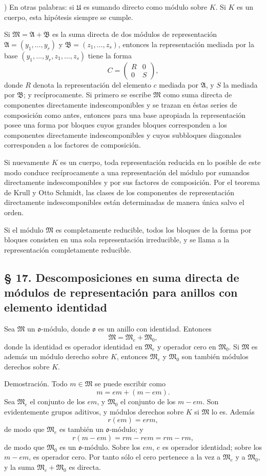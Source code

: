 \documentclass[11pt]{article}
\providecommand{\mA}{\mathfrak{A}}
\providecommand{\mB}{\mathfrak{B}}
\providecommand{\mM}{\mathfrak{M}}
\providecommand{\mU}{\mathfrak{U}}
\providecommand{\mo}{\mathfrak{o}}
\begin{document}
{\footnotesize{}) En otras palabras: si $\mU$ es sumando directo como módulo sobre $K$. Si $K$ es un cuerpo, esta hipótesis siempre se cumple.\par}

Si $\mM=\mA+\mB$ es la suma directa de dos módulos de representación $\mA=(y_1,\ldots,y_r)$ y $\mB=(z_1,\ldots,z_s)$, entonces la representación mediada por la base $(y_1,\ldots,y_r,z_1,\ldots,z_s)$ tiene la forma
\[
        C=\begin{pmatrix}R&0\\0&S\end{pmatrix},
\]
donde $R$ denota la representación del elemento $c$ mediada por $\mA$, y $S$ la mediada por $\mB$; y recíprocamente. Si primero se escribe $\mM$ como suma directa de componentes directamente indescomponibles y se trazan en éstas series de composición como antes, entonces para una base apropiada la representación posee una forma por bloques cuyos grandes bloques corresponden a los componentes directamente indescomponibles y cuyos subbloques diagonales corresponden a los factores de composición.

Si nuevamente $K$ es un cuerpo, toda representación reducida en lo posible de este modo conduce recíprocamente a una representación del módulo por sumandos directamente indescomponibles y por sus factores de composición. Por el teorema de Krull y Otto Schmidt, las clases de los componentes de representación directamente indescomponibles están determinadas de manera única salvo el orden.

Si el módulo $\mM$ es completamente reducible, todos los bloques de la forma por bloques consisten en una sola representación irreducible, y se llama a la representación completamente reducible.

\subsection*{§ 17. Descomposiciones en suma directa de módulos de representación para anillos con elemento identidad}

Sea $\mM$ un $\mo$-módulo, donde $\mo$ es un anillo con identidad. Entonces
\[
        \mM=\mM_e+\mM_0,
\]
donde la identidad es operador identidad en $\mM_e$ y operador cero en $\mM_0$. Si $\mM$ es además un módulo derecho sobre $K$, entonces $\mM_e$ y $\mM_0$ son también módulos derechos sobre $K$.

Demostración. Todo $m\in\mM$ se puede escribir como
\[
        m=em+(m-em).
\]
Sea $\mM_e$ el conjunto de los $em$, y $\mM_0$ el conjunto de los $m-em$. Son evidentemente grupos aditivos, y módulos derechos sobre $K$ si $\mM$ lo es. Además
\[
        r(em)=erm,
\]
de modo que $\mM_e$ es también un $\mo$-módulo; y
\[
        r(m-em)=rm-rem=rm-rm,
\]
de modo que $\mM_0$ es un $\mo$-módulo. Sobre los $em$, $e$ es operador identidad; sobre los $m-em$, es operador cero. Por tanto sólo el cero pertenece a la vez a $\mM_e$ y a $\mM_0$, y la suma $\mM_e+\mM_0$ es directa.
\end{document}
